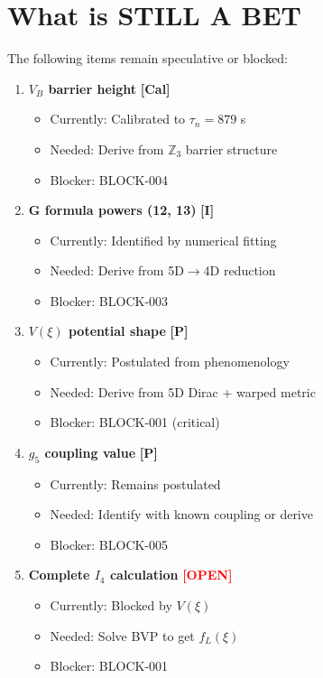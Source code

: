 \documentclass[11pt,a4paper]{article}
\newcommand{\tagP}{\textcolor{red!70!black}{\textbf{[P]}}}
\newcommand{\tagI}{\textcolor{orange!80!black}{\textbf{[I]}}}
\newcommand{\tagCal}{\textcolor{purple!70!black}{\textbf{[Cal]}}}
\newcommand{\tagOPEN}{\textcolor{red}{\textbf{[OPEN]}}}
\begin{document}
\section{What is STILL A BET}
\label{sec:what_bet}

The following items remain speculative or blocked:

\begin{enumerate}
    \item \textbf{$V_B$ barrier height} \tagCal{}
    \begin{itemize}[nosep]
        \item Currently: Calibrated to $\tau_n = 879$ s
        \item Needed: Derive from $\mathbb{Z}_3$ barrier structure
        \item Blocker: BLOCK-004
    \end{itemize}

    \item \textbf{G formula powers (12, 13)} \tagI{}
    \begin{itemize}[nosep]
        \item Currently: Identified by numerical fitting
        \item Needed: Derive from 5D$\to$4D reduction
        \item Blocker: BLOCK-003
    \end{itemize}

    \item \textbf{$V(\xi)$ potential shape} \tagP{}
    \begin{itemize}[nosep]
        \item Currently: Postulated from phenomenology
        \item Needed: Derive from 5D Dirac + warped metric
        \item Blocker: BLOCK-001 (critical)
    \end{itemize}

    \item \textbf{$g_5$ coupling value} \tagP{}
    \begin{itemize}[nosep]
        \item Currently: Remains postulated
        \item Needed: Identify with known coupling or derive
        \item Blocker: BLOCK-005
    \end{itemize}

    \item \textbf{Complete $I_4$ calculation} \tagOPEN{}
    \begin{itemize}[nosep]
        \item Currently: Blocked by $V(\xi)$
        \item Needed: Solve BVP to get $f_L(\xi)$
        \item Blocker: BLOCK-001
    \end{itemize}
\end{enumerate}
\end{document}
